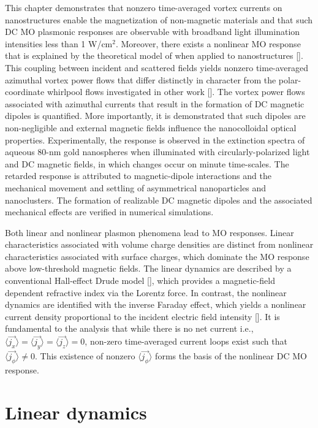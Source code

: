 This chapter demonstrates that nonzero time-averaged vortex currents on nanostructures enable the magnetization of non-magnetic materials and that such DC MO plasmonic responses are observable with broadband light illumination intensities less than 1 W/cm$^2$. Moreover, there exists a nonlinear MO response that is explained by the theoretical model of \cite{Hertel} when applied to nanostructures [\cite{Singh, Brandao, Bliokh}]. This coupling between incident and scattered fields yields nonzero time-averaged azimuthal vortex power flows that differ distinctly in character from the polar-coordinate whirlpool flows investigated in other work [\cite{Boriskina,Bashevoy}]. The vortex power flows associated with azimuthal currents that result in the formation of DC magnetic dipoles is quantified. More importantly, it is demonstrated that such dipoles are non-negligible and external magnetic fields influence the nanocolloidal optical properties. Experimentally, the response is observed in the extinction spectra of aqueous 80-nm gold nanospheres when illuminated with circularly-polarized light and DC magnetic fields, in which changes occur on minute time-scales. The retarded response is attributed to magnetic-dipole interactions and the mechanical movement and settling of asymmetrical nanoparticles and nanoclusters. The formation of realizable DC magnetic dipoles and the associated mechanical effects are verified in numerical simulations.

Both linear and nonlinear plasmon phenomena lead to MO responses. Linear characteristics associated with volume charge densities are distinct from nonlinear characteristics associated with surface charges, which dominate the MO response above low-threshold magnetic fields. The linear dynamics are described by a conventional Hall-effect Drude model [\cite{Mulvaney}], which provides a magnetic-field dependent refractive index via the Lorentz force. In contrast, the nonlinear dynamics are identified with the inverse Faraday effect, which yields a nonlinear current density proportional to the incident electric field intensity [\cite{Hertel}]. It is fundamental to the analysis that while there is no net current i.e., $\langle\vec{j_x}\rangle= \langle\vec{j_y}\rangle= \langle\vec{j_z}\rangle=0$, non-zero time-averaged current loops exist such that $\langle\vec{j_{\phi}}\rangle \neq 0$. This existence of nonzero $\langle\vec{j_{\phi}}\rangle$ forms the basis of the nonlinear DC MO response.
\section{Linear dynamics}

